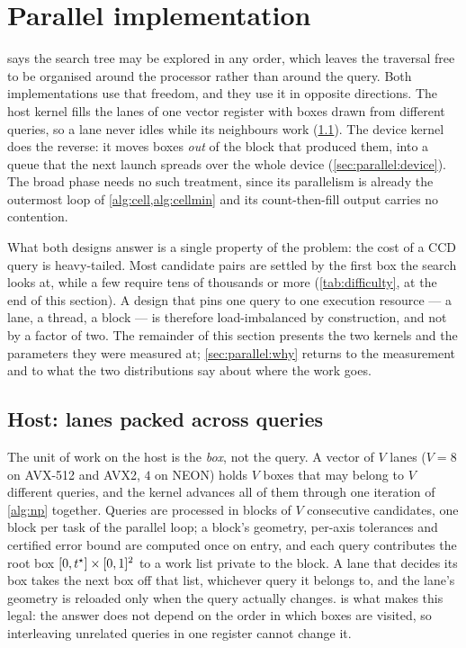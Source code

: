 \section{Parallel implementation}
\label{sec:parallel}

 says the search tree may be explored in any order, which
leaves the traversal free to be organised around the processor rather than
around the query. Both implementations use that freedom, and they use it in
opposite directions. The host kernel fills the lanes of one vector register with
boxes drawn from different queries, so a lane never idles while its neighbours
work (\cref{sec:parallel:host}). The device kernel does the reverse: it moves
boxes \emph{out} of the block that produced them, into a queue that the next
launch spreads over the whole device (\cref{sec:parallel:device}). The broad
phase needs no such treatment, since its parallelism is already the outermost
loop of \cref{alg:cell,alg:cellmin} and its count-then-fill output carries no
contention.

What both designs answer is a single property of the problem: the cost of a CCD
query is heavy-tailed. Most candidate pairs are settled by the first box the
search looks at, while a few require tens of thousands or more
(\cref{tab:difficulty}, at the end of this section). A design that pins one
query to one execution resource --- a lane, a thread, a block --- is therefore
load-imbalanced by construction, and not by a factor of two. The remainder of
this section presents the two kernels and the parameters they were measured at;
\cref{sec:parallel:why} returns to the measurement and to what the two
distributions say about where the work goes.

\subsection{Host: lanes packed across queries}
\label{sec:parallel:host}

The unit of work on the host is the \emph{box}, not the query. A vector of $V$
lanes ($V=8$ on AVX-512 and AVX2, $4$ on NEON) holds $V$ boxes that may belong
to $V$ different queries, and the kernel advances all of them through one
iteration of \cref{alg:np} together. Queries are processed in blocks of $V$
consecutive candidates, one block per task of the parallel loop; a block's
geometry, per-axis tolerances and certified error bound are computed once on
entry, and each query contributes the root box $[0,t^{\star}]\times[0,1]^{2}$ to a
work list private to the block. A lane that decides its box takes the next box
off that list, whichever query it belongs to, and the lane's geometry is
reloaded only when the query actually changes.  is what makes
this legal: the answer does not depend on the order in which boxes are visited,
so interleaving unrelated queries in one register cannot change it.

